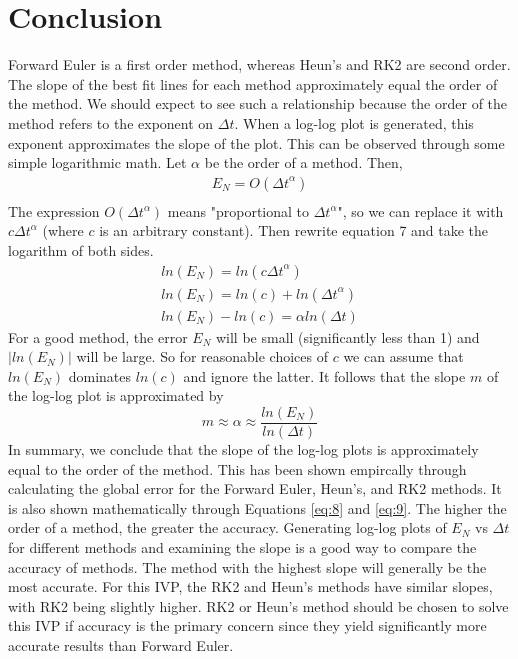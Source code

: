 \documentclass{article}
\begin{document}
\section{Conclusion}
Forward Euler is a first order method, whereas Heun's and RK2 are second order.  The slope of the best fit lines for each method approximately equal the order of the method.  We should expect to see such a relationship because the order of the method refers to the exponent on $\Delta t$.  When a log-log plot is generated, this exponent approximates the slope of the plot.  This can be observed through some simple logarithmic math.  Let $\alpha$ be the order of a method.  Then,
\begin{equation} \label{eq:7}
\begin{split}
    E_N = O({\Delta t}^\alpha) \\
\end{split}
\end{equation}
The expression $O(\Delta t^\alpha)$ means "proportional to $\Delta t^{\alpha}$", so we can replace it with $c{\Delta t}^\alpha$ (where $c$ is an arbitrary constant).  Then rewrite equation 7 and take the logarithm of both sides.
\begin{equation} \label{eq:8}
\begin{split}
    ln(E_N) = ln(c{\Delta t}^\alpha) \\
    ln(E_N) = ln(c) + ln({\Delta t}^\alpha) \\
    ln(E_N) - ln(c) = {\alpha}ln(\Delta t)
\end{split}
\end{equation}
For a good method, the error $E_N$ will be small (significantly less than 1) and $|ln(E_N)|$ will be large.  So for reasonable choices of $c$ we can assume that $ln(E_N)$ dominates $ln(c)$ and ignore the latter.  It follows that the slope $m$ of the log-log plot is approximated by
\begin{equation} \label{eq:9}
    m \approx \alpha \approx \frac{ln(E_N)}{ln(\Delta t)}
\end{equation}
In summary, we conclude that the slope of the log-log plots is approximately equal to the order of the method.  This has been shown empircally through calculating the global error for the Forward Euler, Heun's, and RK2 methods.  It is also shown mathematically through Equations \ref{eq:8} and \ref{eq:9}.  The higher the order of a method, the greater the accuracy.  Generating log-log plots of $E_N$ vs $\Delta t$ for different methods and examining the slope is a good way to compare the accuracy of methods.  The method with the highest slope will generally be the most accurate.  For this IVP, the RK2 and Heun's methods have similar slopes, with RK2 being slightly higher.  RK2 or Heun's method should be chosen to solve this IVP if accuracy is the primary concern since they yield significantly more accurate results than Forward Euler.
\end{document}

